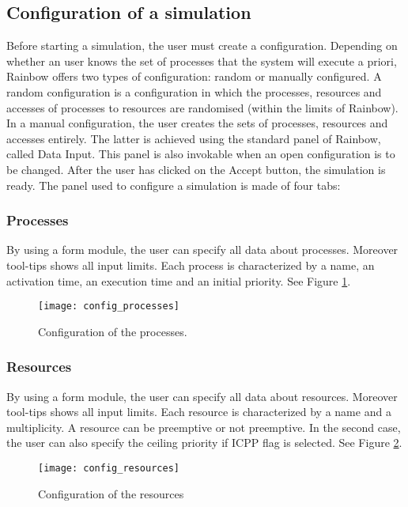 \documentclass[10pt,a4paper,twoside,titlepage]{article}
\begin{document}
\subsection{Configuration of a simulation}
\label{subsec:configuration_of_a_simulation}
Before starting a simulation, the user must create a configuration. 
Depending on whether an user knows the set of processes that the system will execute a priori, Rainbow offers two types of configuration: random or manually configured. A random configuration is a configuration in which the processes, resources and accesses of processes to resources are randomised (within the limits of Rainbow). In a manual configuration, the user creates the sets of processes, resources and accesses entirely. The latter is achieved using the standard panel of Rainbow, called Data Input. This panel is also invokable when an open configuration is to be changed. After the user has clicked on the Accept button, the simulation is ready.
The panel used to configure a simulation is made of four tabs:

\subsubsection{Processes}
\label{subsubsec:Processes}
By using a form module, the user can specify all data about processes. Moreover tool-tips shows all input limits. Each process is characterized by a name, an activation time, an execution time and an initial priority. See Figure \ref{fig:config_processes}.
\begin{figure}[tb]
	\begin{center}
		\texttt{[image: config\_processes]}
		\caption[Configuration of the processes]{Configuration of the processes.}
		\label{fig:config_processes}
	\end{center}
\end{figure}


\subsubsection{Resources}
\label{subsubsec:resources}
By using a form module, the user can specify all data about resources. Moreover tool-tips shows all input limits. Each resource is characterized by a name and a multiplicity. A resource can be preemptive or not preemptive. In the second case, the user can also specify the ceiling priority if ICPP flag is selected. See Figure \ref{fig:config_resources}.
\begin{figure}[tb]
	\begin{center}
		\texttt{[image: config\_resources]}
		\caption[Configuration of the resources]{Configuration of the resources}
		\label{fig:config_resources}
	\end{center}
\end{figure}
\end{document}
